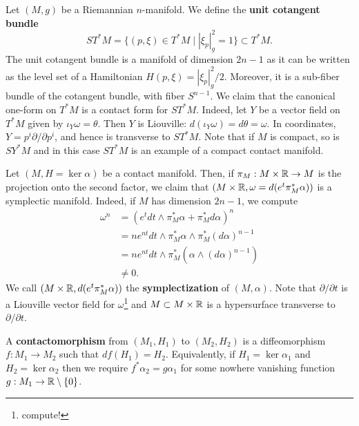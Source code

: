 \documentclass{amsart}
\begin{document}
\begin{example}
    Let $(M,g)$ be a Riemannian $n$-manifold. We define the \textbf{unit cotangent bundle}
    \begin{equation*}
        ST^*M = \{(p,\xi)\in T^*M \mid |\xi_p|_g^2=1\}\subset T^*M.
    \end{equation*}
    The unit cotangent bundle is a manifold of dimension $2n-1$ as it can be written as the level set of a
    Hamiltonian $H(p,\xi)=|\xi_p|^2_g/2$. Moreover, it is a sub-fiber bundle of the
    cotangent bundle, with fiber $S^{n-1}$. We claim that the canonical one-form on $T^*M$
    is a contact form for $ST^*M$. Indeed, let $Y$ be a vector field on $T^*M$ given by $\iota_Y\omega=\theta$.
    Then $Y$ is Liouville: $d(\iota_Y\omega)=d\theta=\omega$. In coordinates, $Y=p^i\partial/\partial p^i$,
    and hence is transverse to $ST^*M$. Note that if $M$ is compact, so is $SY^*M$ and in this
    case $ST^*M$ is an example of a compact contact manifold.
\end{example}

\begin{example}
    Let $(M,H=\ker\alpha)$ be a contact manifold. Then, if $\pi_M:M\times\mathbb{R}\to M$ is the projection
    onto the second factor, we claim that $(M\times\mathbb{R}, \omega=d(e^t\pi^*_M\alpha))$ is a symplectic manifold.
    Indeed, if $M$ has dimension $2n-1$, we compute
    \begin{align*}
        \omega^n &= (e^tdt\wedge\pi^*_M\alpha+\pi_M^*d\alpha)^n\\
        &=ne^{nt}dt\wedge\pi_M^*\alpha\wedge\pi_M^*(d\alpha)^{n-1}\\
        &=ne^{nt}dt\wedge\pi^*_M\left(\alpha\wedge (d\alpha)^{n-1}\right)\\
        &\neq0.
    \end{align*}
    We call $(M\times\mathbb{R},d(e^t\pi_M^*\alpha))$ the \textbf{symplectization} of $(M,\alpha)$.
    Note that $\partial/\partial t$ is a Liouville vector field for $\omega$\footnote{compute!}
    and $M\subset M\times\mathbb{R}$ is a hypersurface transverse to $\partial/\partial t$.
\end{example}

\begin{definition}
    A \textbf{contactomorphism} from $(M_1,H_1)$ to $(M_2,H_2)$ is a diffeomorphism $f:M_1\to M_2$
    such that $df(H_1)=H_2$. Equivalently, if $H_1=\ker\alpha_1$ and $H_2=\ker\alpha_2$ then we
    require $f^*\alpha_2=g\alpha_1$ for some nowhere vanishing function $g:M_1\to\mathbb{R}\setminus\{0\}$.
\end{definition}
\end{document}
